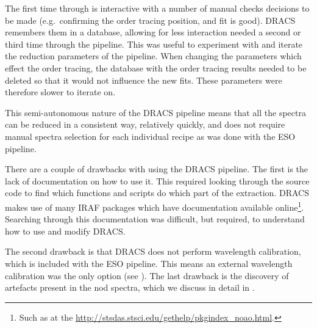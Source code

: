 The first time through is interactive with a number of manual checks decisions to be made (e.g.\ confirming the order tracing position, and fit is good).
{DRACS} remembers them in a database, allowing for less interaction needed a second or third time through the pipeline.
This was useful to experiment with and iterate the reduction parameters of the pipeline.
When changing the parameters which effect the order tracing, the database with the order tracing results needed to be deleted so that it would not influence the new fits.
These parameters were therefore slower to iterate on.

This semi-autonomous nature of the {DRACS} pipeline means that all the spectra can be reduced in a consistent way, relatively quickly, and does not require manual spectra selection for each individual recipe as was done with the {ESO} pipeline.

There are a couple of drawbacks with using the {DRACS} pipeline.
The first is the lack of documentation on how to use it.
This required looking through the source code to find which functions and scripts do which part of the extraction.
{DRACS} makes use of many {IRAF} packages which have documentation available online\footnote{Such as at the \href{Space Telescope Science Institute}{http://stsdas.stsci.edu/gethelp/pkgindex\_noao.html}.}.
Searching through this documentation was difficult, but required, to understand how to use and modify {DRACS}.

The second drawback is that {DRACS} does not perform wavelength calibration, which is included with the {ESO} pipeline.
This means an external wavelength calibration was the only option (see ).
The last drawback is the discovery of artefacts present in the nod spectra, which we discuss in detail in .

